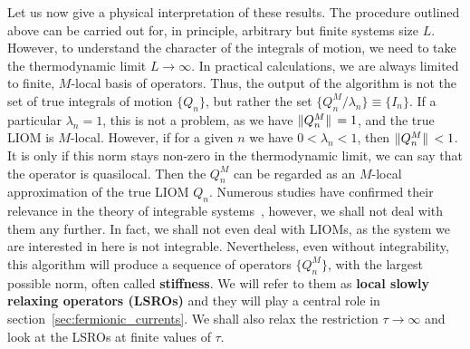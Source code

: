   Let us now give a physical interpretation of these results. The procedure outlined above
  can be carried out for, in principle, arbitrary but finite systems size \(L\). However,
  to understand the character of the integrals of motion, we need to take the thermodynamic
  limit \(L\to\infty\). In practical calculations, we are always limited to finite, \(M\)-local basis
  of operators. Thus, the output of the algorithm is not the set of true integrals of motion \(\{Q_n\}\),
  but rather the set \(\{Q_n^M/\lambda_n\} \equiv \{I_n\}\). If a particular \(\lambda_n = 1\), this
  is not a problem, as we have \(\norm*{Q^M_n} = 1\), and the true LIOM is \(M\)-local. However, if 
  for a given \(n\) we have \(0 < \lambda_n < 1\), then \(\norm*{Q^M_n} < 1\). It is only if this norm
  stays non-zero in the thermodynamic limit, we can say that the operator is quasilocal. Then the \(Q_n^M\)
can be regarded as an \(M\)-local approximation of the true LIOM \(Q_n\).
  Numerous studies have confirmed their relevance in the theory of integrable 
  systems~\autocite{Ilievski2015, Ilievski2015b, Prosen2013, Prosen2014},
  however, we shall not deal with them any further. In fact, we shall not even deal with LIOMs, as
  the system we are interested in here is not integrable. Nevertheless, even without integrability,
  this algorithm will produce a sequence of operators \(\{Q^M_n\}\), with the largest possible norm,
  often called \textbf{stiffness}. We will refer to them as \textbf{local slowly relaxing operators (LSROs)}
  and they will play a central role in section~\ref{sec:fermionic_currents}. We shall also relax the restriction
  \(\tau\to\infty\) and look at the LSROs at finite values of \(\tau\).

